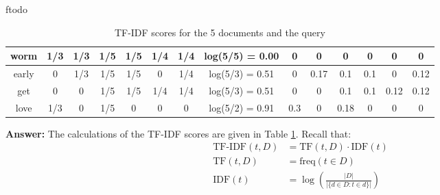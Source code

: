 ƒtodo\documentclass{article}
\newenvironment{QandA}{\begin{enumerate}[label=\arabic*.]}{\end{enumerate}}
\newenvironment{InnerQandA}{\begin{enumerate}[label=\roman*.]}{\end{enumerate}}
\newenvironment{answer}{\par\normalfont \textbf{Answer:}}{}
\begin{document}
\begin{QandA}
\begin{InnerQandA}
\begin{table}[h!]
\begin{tabular}{|c|cccccc|c|cccccc|}
            worm              & \multicolumn{1}{c|}{1/3} & \multicolumn{1}{c|}{1/3} & \multicolumn{1}{c|}{1/5} & \multicolumn{1}{c|}{1/5} & \multicolumn{1}{c|}{1/4} & 1/4 & log(5/5) = 0.00         & \multicolumn{1}{c|}{0}    & \multicolumn{1}{c|}{0}    & \multicolumn{1}{c|}{0}    & \multicolumn{1}{c|}{0}    & \multicolumn{1}{c|}{0}    & 0    \\ \hline
            early             & \multicolumn{1}{c|}{0}   & \multicolumn{1}{c|}{1/3} & \multicolumn{1}{c|}{1/5} & \multicolumn{1}{c|}{1/5} & \multicolumn{1}{c|}{0}   & 1/4 & log(5/3) = 0.51      & \multicolumn{1}{c|}{0}    & \multicolumn{1}{c|}{0.17} & \multicolumn{1}{c|}{0.1}  & \multicolumn{1}{c|}{0.1}  & \multicolumn{1}{c|}{0}    & 0.12 \\ \hline
            get               & \multicolumn{1}{c|}{0}   & \multicolumn{1}{c|}{0}   & \multicolumn{1}{c|}{1/5} & \multicolumn{1}{c|}{1/5} & \multicolumn{1}{c|}{1/4} & 1/4 & log(5/3) = 0.51      & \multicolumn{1}{c|}{0}    & \multicolumn{1}{c|}{0}    & \multicolumn{1}{c|}{0.1}  & \multicolumn{1}{c|}{0.1}  & \multicolumn{1}{c|}{0.12} & 0.12 \\ \hline
            love              & \multicolumn{1}{c|}{1/3} & \multicolumn{1}{c|}{0}   & \multicolumn{1}{c|}{1/5}  & \multicolumn{1}{c|}{0}   & \multicolumn{1}{c|}{0}   & 0   & log(5/2) = 0.91      & \multicolumn{1}{c|}{0.3}  & \multicolumn{1}{c|}{0}    & \multicolumn{1}{c|}{0.18} & \multicolumn{1}{c|}{0}    & \multicolumn{1}{c|}{0}    & 0    \\ \hline
            \end{tabular}
            \caption{TF-IDF scores for the 5 documents and the query}
            \label{tab:tf-idf-1}
            \end{table}
        \begin{answer}
            The calculations of the TF-IDF scores are given in Table \ref{tab:tf-idf-1}. Recall that:
            \begin{align*}
                \text{TF-IDF}(t, D) &= \text{TF}(t, D) \cdot \text{IDF}(t) \\
                \text{TF}(t, D) &= \text{freq}(t \in D) \\
                \text{IDF}(t) &= \log \left( \frac{\vert D \vert}{\vert \{ d \in D: t \in d \}\vert}\right)
            \end{align*}
            

\end{answer}
\end{InnerQandA}
\end{QandA}
\end{document}
